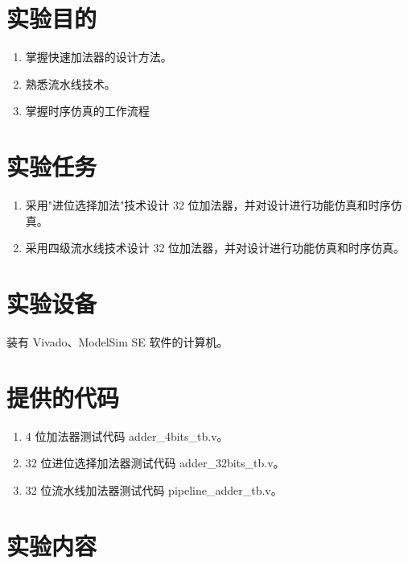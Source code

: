 \documentclass[12pt,a4paper,UTF8]{article}
\begin{document}

\maketoc

\section{\heiti\bfseries 实验目的}
\begin{enumerate}
    \item 掌握快速加法器的设计方法。
    \item 熟悉流水线技术。
    \item 掌握时序仿真的工作流程
\end{enumerate}

\section{\heiti\bfseries 实验任务}
\begin{enumerate}
    \item 采用"进位选择加法"技术设计 32 位加法器，并对设计进行功能仿真和时序仿真。
    \item 采用四级流水线技术设计 32 位加法器，并对设计进行功能仿真和时序仿真。
\end{enumerate}

\section{\heiti\bfseries 实验设备}

装有 Vivado、ModelSim SE 软件的计算机。

\section{\heiti\bfseries 提供的代码}

\begin{enumerate}
    \item 4 位加法器测试代码 adder\_4bits\_tb.v。
    \item 32 位进位选择加法器测试代码 adder\_32bits\_tb.v。
    \item 32 位流水线加法器测试代码 pipeline\_adder\_tb.v。
\end{enumerate}

\section{\heiti\bfseries 实验内容}
\end{document}
